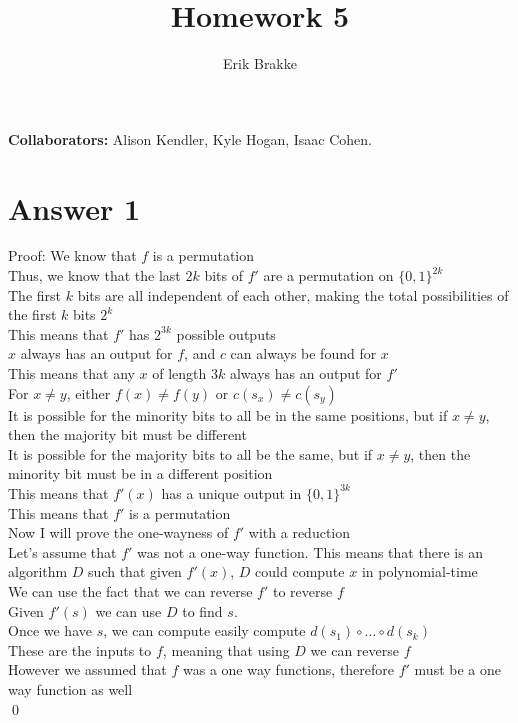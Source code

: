 \documentclass[11pt]{article}
\providecommand{\myparab}[1]{\smallskip\noindent\textbf{#1} }
\theoremstyle{definition}
\begin{document}
\title{Homework 5}
\author{Erik Brakke}
\maketitle

\thispagestyle{fancy}

\myparab{Collaborators: }  Alison Kendler, Kyle Hogan, Isaac Cohen.
 
 
\section*{Answer 1}
Proof: We know that $f$ is a permutation\\
Thus, we know that the last $2k$ bits of $f'$ are a permutation on $\{0,1\}^{2k}$\\
The first $k$ bits are all independent of each other, making the total possibilities of the first $k$ bits $2^k$\\
This means that $f'$ has $2^{3k}$ possible outputs\\
$x$ always has an output for $f$, and $c$ can always be found for $x$\\
This means that any $x$ of length $3k$ always has an output for $f'$\\
For $x \neq y$, either $f(x) \neq f(y)$ or $c(s_x) \neq c(s_y)$\\
It is possible for the minority bits to all be in the same positions, but if $x \neq y$, then the majority bit must be different\\
It is possible for the majority bits to all be the same, but if $x \neq y$, then the minority bit must be in a different position\\
This means that $f'(x)$ has a unique output in $\{0,1\}^{3k}$\\
This means that $f'$ is a permutation\\
\newline
Now I will prove the one-wayness of $f'$ with a reduction\\
Let's assume that $f'$ was not a one-way function.  This means that there is an algorithm $D$ such that given $f'(x)$, $D$ could compute $x$ in polynomial-time\\
We can use the fact that we can reverse $f'$ to reverse $f$\\
Given $f'(s)$ we can use $D$ to find $s$.\\
Once we have $s$, we can compute easily compute $d(s_1) \circ ... \circ d(s_k)$\\
These are the inputs to $f$, meaning that using $D$ we can reverse $f$\\
However we assumed that $f$ was a one way functions, therefore $f'$ must be a one way function as well\\
\qed
\end{document}
